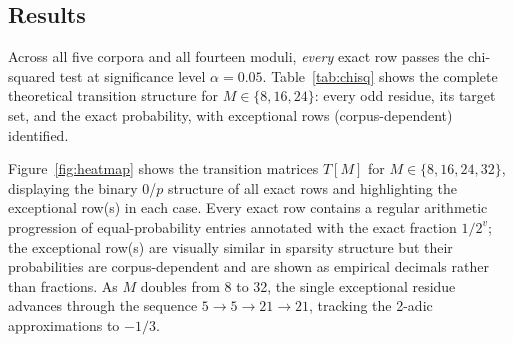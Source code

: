 \documentclass[12pt,a4paper]{article}
\begin{document}
\subsection{Results}

Across all five corpora and all fourteen moduli, \emph{every} exact row passes
the chi-squared test at significance level $\alpha = 0.05$.
Table~\ref{tab:chisq} shows the complete theoretical transition structure for
$M \in \{8, 16, 24\}$: every odd residue, its target set, and the exact
probability, with exceptional rows (corpus-dependent) identified.

Figure~\ref{fig:heatmap} shows the transition matrices $T[M]$ for $M \in
\{8, 16, 24, 32\}$, displaying the binary 0/$p$ structure of all exact rows
and highlighting the exceptional row(s) in each case.  Every exact row
contains a regular arithmetic progression of equal-probability entries
annotated with the exact fraction $1/2^v$; the exceptional row(s) are
visually similar in sparsity structure but their probabilities are
corpus-dependent and are shown as empirical decimals rather than fractions.
As $M$ doubles from 8 to 32, the single exceptional residue advances through
the sequence $5 \to 5 \to 21 \to 21$, tracking the 2-adic approximations to
$-1/3$.
\end{document}
